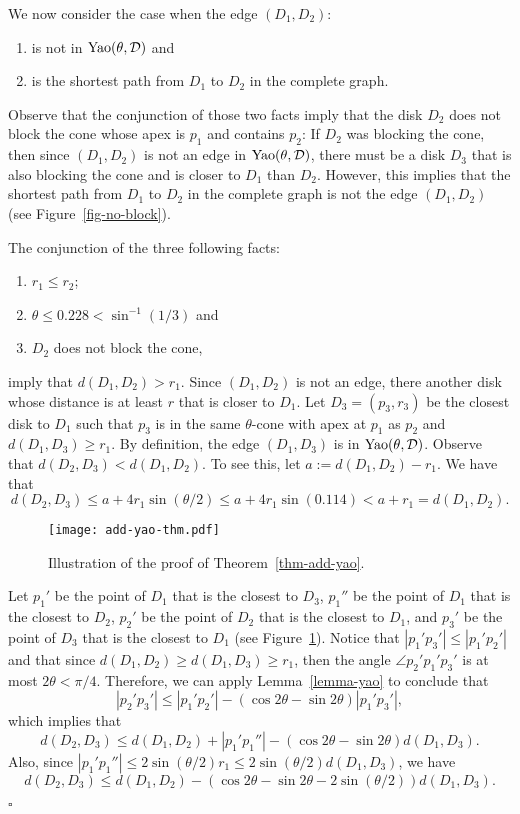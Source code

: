 \documentclass[pdftex,leqno,fleqn,12pt]{article}
\newcommand{\YAO}{{\rm{Yao}}}
\newenvironment{proof}{{\textit Proof:} \rm}{\hfill $\square$ \medskip\\}
\begin{document}
\begin{proof}
We now consider the case when the edge $(D_1,D_2)$:
\begin{enumerate}
\item is not in $\YAO(\theta,\mathcal{D})$ and
\item is the shortest path from $D_1$ to $D_2$ in the complete graph.
\end{enumerate}

Observe that the conjunction of those two facts imply that the disk $D_2$ does
not block the cone whose apex is $p_1$ and contains $p_2$: If $D_2$ was
blocking the cone, then since $(D_1,D_2)$ is not an edge in
$\YAO(\theta,\mathcal{D})$, there must be a disk $D_3$ that is also blocking
the cone and is closer to $D_1$ than $D_2$. However, this implies that the
shortest path from $D_1$ to $D_2$ in the complete graph is not the edge
$(D_1,D_2)$ (see Figure~\ref{fig-no-block}).

The conjunction of the three following facts:
\begin{enumerate}
\item $r_1\leq r_2$;
\item $\theta \leq 0.228 < \sin^{-1}(1/3)$ and
\item $D_2$ does not block the cone,
\end{enumerate}
imply that $d(D_1,D_2)>r_1$. Since $(D_1,D_2)$ is not an edge, there another
disk whose distance is at least $r$ that is closer to $D_1$. Let
$D_3=(p_3,r_3)$ be the closest disk to $D_1$ such that $p_3$ is in the same
$\theta$-cone with apex at $p_1$ as $p_2$ and $d(D_1,D_3)\geq r_1$. By
definition, the edge $(D_1,D_3)$ is in $\YAO(\theta,\mathcal{D})$.  Observe
that $d(D_2,D_3)<d(D_1,D_2)$. To see this, let $a:=d(D_1,D_2)-r_1$. We have
that $$d(D_2,D_3) \leq a + 4r_1\sin(\theta/2)\leq a + 4r_1\sin(0.114) < a+r_1 =
d(D_1,D_2).$$
\begin{figure} \centering\texttt{[image: add-yao-thm.pdf]}\caption{Illustration
of the proof of Theorem~\ref{thm-add-yao}.}\label{fig-add-yao} \end{figure}
Let $p_1'$ be the point of $D_1$ that is the closest to $D_3$, $p_1''$ be the
point of $D_1$ that is the closest to $D_2$, $p_2'$ be the point of $D_2$ that
is the closest to $D_1$, and $p_3'$ be the point of $D_3$ that is the closest
to $D_1$ (see Figure~\ref{fig-add-yao}). Notice that $|p_1'p_3'|\leq
|p_1'p_2'|$ and that since $d(D_1,D_2)\geq d(D_1,D_3) \geq r_1$, then the angle
$\angle p_2'p_1'p_3'$ is at most $2\theta<\pi/4$.  Therefore, we can apply
Lemma~\ref{lemma-yao} to conclude that $$|p_2'p_3'|\leq |p_1'p_2'|-(\cos
2\theta-\sin 2\theta)|p_1'p_3'|,$$ which implies that $$d(D_2,D_3)\leq
d(D_1,D_2)+|p_1'p_1''|-(\cos 2\theta-\sin 2\theta)d(D_1,D_3).$$ Also, since
$|p_1'p_1''|\leq 2\sin(\theta/2)r_1\leq 2\sin(\theta/2)d(D_1,D_3)$, we have
$$d(D_2,D_3)\leq d(D_1,D_2)-(\cos 2\theta-\sin
2\theta-2\sin(\theta/2))d(D_1,D_3).$$


\end{proof}
\end{document}
